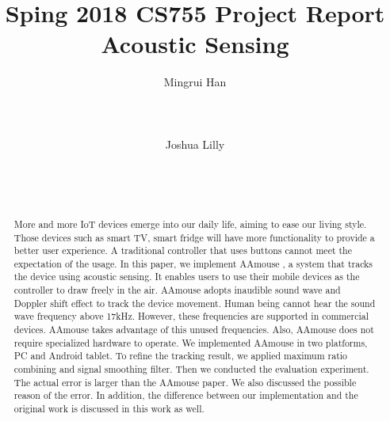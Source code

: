\documentclass{acm_proc_article-sp}
\begin{document}
\title{Sping 2018 CS755 Project Report Acoustic Sensing}

\author{
\alignauthor
Mingrui Han\\
       \\
       \\
       \\
\alignauthor
Joshua Lilly\\
       \\
       \\
       \\
}

\maketitle
\begin{abstract}
More and more IoT devices emerge into our daily life, aiming to ease
our living style. Those devices such as smart TV, smart fridge
will have more functionality to provide a better user experience.
A traditional controller that uses buttons cannot meet the expectation
of the usage. In this paper, we implement AAmouse \cite{yun:turning}, a system that tracks the device using acoustic sensing. It enables
users to use their mobile devices as the controller to
draw freely in the air. AAmouse adopts inaudible sound wave and Doppler shift effect to track the device movement. Human being cannot
hear the sound wave frequency above 17kHz. However, these frequencies 
are supported in commercial devices. AAmouse takes advantage of this
unused frequencies. Also, AAmouse does not require specialized 
hardware to operate. We implemented AAmouse in two platforms, PC and Android tablet. To refine the tracking result, we applied maximum
ratio combining and signal smoothing filter. Then we conducted the 
evaluation experiment. The actual error is larger than the AAmouse
paper. We also discussed the possible reason of the error. In 
addition, the difference between our implementation and the 
original work is discussed in this work as well.
\end{abstract}

\end{document}
